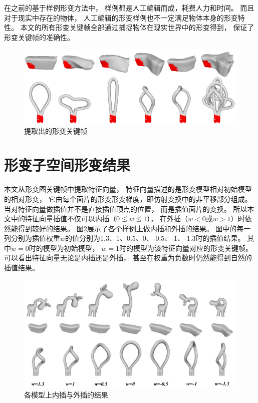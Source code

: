 在之前的基于样例形变方法中，
样例都是人工编辑而成，耗费人力和时间。
而且对于现实中存在的物体，
人工编辑的形变样例也不一定满足物体本身的形变特性。
本文的所有形变关键帧全部通过捕捉物体在现实世界中的形变得到，
保证了形变关键帧的准确性。
\begin{figure}
    \centering
    \includegraphics[width = \textwidth]{./Pictures/pillow_tube_keyframe.png}
    \caption{提取出的形变关键帧}
    \label{pillow_tube_keyframe}
\end{figure}

\section{形变子空间形变结果}\label{sec_subspace_res}
本文从形变图关键帧中提取特征向量，
特征向量描述的是形变模型相对初始模型的相对形变，
它由每个面片的形变形变梯度，即仿射变换中的非平移部分组成。
当对特征向量做插值并不是直接插值顶点的位置，
而是插值面片的变换。
所以本文中的特征向量插值不仅可以内插（$0 \lneq w \lneq 1$），
在外插（$w<0$或$w>1$）时依然能得到较好的结果。
图\ref{extrapolation}展示了各个样例上做内插和外插的结果。
图中的每一列分别为插值权重$w$的值分别为1.3、1、0.5、0、-0.5、-1、-1.3时的插值结果。
其中$w=0$时的模型为初始模型，
$w=1$时的模型为该特征向量对应的形变关键帧。
可以看出特征向量无论是内插还是外插，
甚至在权重为负数时仍然能得到自然的插值结果。
\begin{figure}[h]
    \centering
    \includegraphics[width = \textwidth]{./Pictures/extrapolation.png}
    \caption{各模型上内插与外插的结果}
    \label{extrapolation}
\end{figure}

